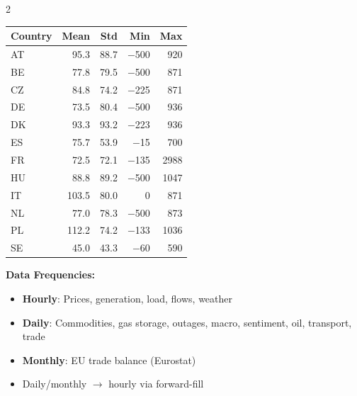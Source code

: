 \documentclass[11pt,a4paper]{article}
\begin{document}
\begin{multicols}{2}
\small
\begin{tabular}{l r r r r}
\toprule
\textbf{Country} & \textbf{Mean} & \textbf{Std} & \textbf{Min} & \textbf{Max} \\
\midrule
AT & 95.3  & 88.7 & $-$500 & 920 \\
BE & 77.8  & 79.5 & $-$500 & 871 \\
CZ & 84.8  & 74.2 & $-$225 & 871 \\
DE & 73.5  & 80.4 & $-$500 & 936 \\
DK & 93.3  & 93.2 & $-$223 & 936 \\
ES & 75.7  & 53.9 & $-$15  & 700 \\
FR & 72.5  & 72.1 & $-$135 & 2988 \\
HU & 88.8  & 89.2 & $-$500 & 1047 \\
IT & 103.5 & 80.0 &     0  & 871 \\
NL & 77.0  & 78.3 & $-$500 & 873 \\
PL & 112.2 & 74.2 & $-$133 & 1036 \\
SE & 45.0  & 43.3 & $-$60  & 590 \\
\bottomrule
\end{tabular}

\vspace{0.2cm}

{\footnotesize
\textbf{Data Frequencies:}
\begin{itemize}[nosep, leftmargin=1em]
    \item \textbf{Hourly}: Prices, generation, load, flows, weather
    \item \textbf{Daily}: Commodities, gas storage, outages, macro, sentiment, oil, transport, trade
    \item \textbf{Monthly}: EU trade balance (Eurostat)
    \item Daily/monthly $\rightarrow$ hourly via forward-fill
\end{itemize}
}

\end{multicols}
\end{document}
